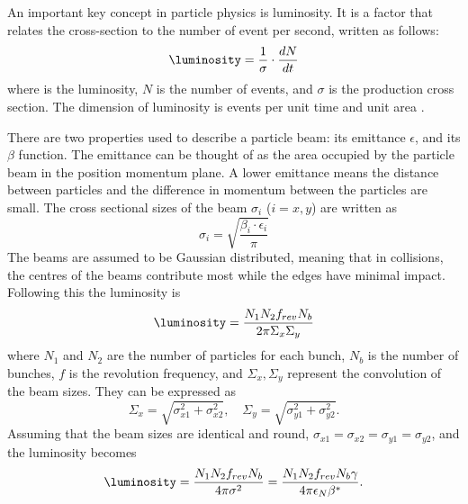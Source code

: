 An important key concept in particle physics is luminosity. It is a factor that relates the cross-section to the number of event per second, written as follows:
\begin{equation}
    \luminosity=\dfrac{1}{\sigma}\cdot\dfrac{dN}{dt}
\end{equation}
where \luminosity is the luminosity, $N$ is the number of events, and $\sigma$ is the production cross section. The dimension of luminosity is events per unit time and unit area \unit{}{\cm\rpsquared}\unit{}{\second\rp}.

There are two properties used to describe a particle beam: its  emittance $\epsilon$, and its $\beta$ function. The emittance can be thought of as the area occupied by the particle beam in the position momentum plane. A lower emittance means the distance between particles and the difference in momentum between the particles are small. The cross sectional sizes of the beam $\sigma_i$ ($i=x,y$) are written as 
\begin{equation}
    \sigma_i=\sqrt{\dfrac{\beta_i\cdot\epsilon_i}{\pi}}
\end{equation}
The beams are assumed to be Gaussian distributed, meaning that in collisions, the centres of the beams contribute most while the edges have minimal impact. Following this the luminosity is
\begin{equation}
    \luminosity=\dfrac{N_1N_2f_{rev}N_b}{2\pi\Sigma_x\Sigma_y}
\end{equation}
where $N_1$ and $N_2$ are the number of particles for each bunch, $N_b$ is the number of bunches, $f$ is the revolution frequency, and $\Sigma_x,\Sigma_y$ represent the  convolution of the beam sizes. They can be expressed as
\begin{equation}
    \Sigma_x=\sqrt{\sigma_{x1}^2+\sigma_{x2}^2}, \quad \Sigma_y=\sqrt{\sigma_{y1}^2+\sigma_{y2}^2}.
\end{equation}
Assuming that the beam sizes are identical and round, $\sigma_{x1}=\sigma_{x2}=\sigma_{y1}=\sigma_{y2}$, and the luminosity becomes
\begin{equation}
    \luminosity=\dfrac{N_1N_2f_{rev}N_b}{4\pi\sigma^2}=\dfrac{N_1N_2f_{rev}N_b\gamma}{4\pi\epsilon_N\beta^*}.
\end{equation}

